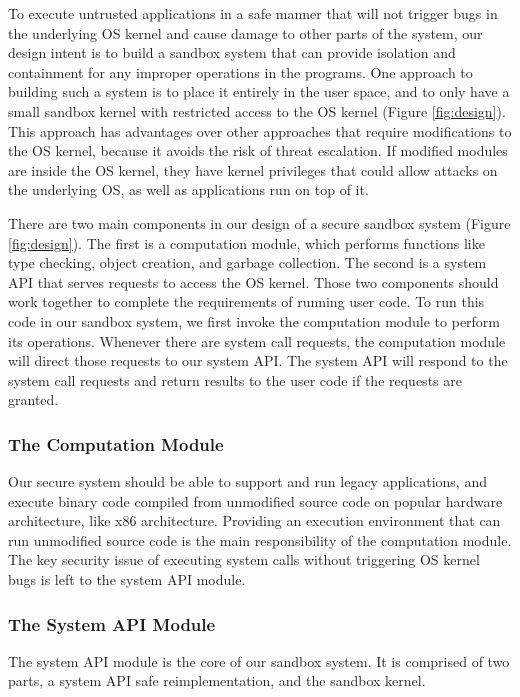 To execute untrusted applications in a safe manner that will not trigger bugs 
in the underlying OS kernel and cause damage to other parts of the system, 
our design intent is to build a sandbox system that can provide isolation and 
containment for any improper operations in the programs. 
One approach to building such a system is to place it entirely in the user space, 
and to only have a small sandbox kernel with restricted access to the OS kernel (Figure \ref{fig:design}). 
This approach has advantages over other approaches that require modifications to 
the OS kernel, because it avoids the risk of threat escalation. If modified modules 
are inside the OS kernel, they have kernel privileges that could allow attacks on the underlying OS, 
as well as applications run on top of it. 

There are two main components in our design of a secure sandbox system (Figure \ref{fig:design}). 
The first is a computation module, which performs functions like type checking, object creation, 
and garbage collection. The second is a system API that serves requests to access the OS kernel. 
Those two components should work together to complete the requirements of running user code. 
To run this code in our sandbox system, we first invoke the computation module to perform its operations. 
Whenever there are system call requests, 
the computation module will direct those requests to our system API. 
The system API will respond to the system call requests and return results to the user code if the requests are granted. 

\subsubsection{The Computation Module}

Our secure system should be able to support and run legacy applications, 
and execute binary code compiled from unmodified source code on popular hardware architecture, 
like x86 architecture. Providing an execution environment that can run unmodified source code is 
the main responsibility of the computation module. The key security issue of executing system calls 
without triggering OS kernel bugs is left to the system API module.

\subsubsection{The System API Module}

The system API module is the core of our sandbox system. It is comprised of two parts, 
a system API safe reimplementation, and the sandbox kernel. 

